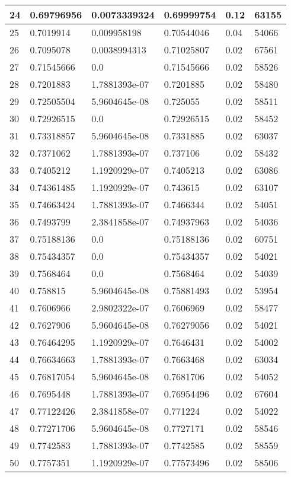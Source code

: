 \begin{longtable}{|l|l|l|l|l|l|}
24 & 0.69796956 & 0.0073339324 & 0.69999754 & 0.12 & 63155 \\ \hline 
25 & 0.7019914 & 0.009958198 & 0.70544046 & 0.04 & 54066 \\ \hline 
26 & 0.7095078 & 0.0038994313 & 0.71025807 & 0.02 & 67561 \\ \hline 
27 & 0.71545666 & 0.0 & 0.71545666 & 0.02 & 58526 \\ \hline 
28 & 0.7201883 & 1.7881393e-07 & 0.7201885 & 0.02 & 58480 \\ \hline 
29 & 0.72505504 & 5.9604645e-08 & 0.725055 & 0.02 & 58511 \\ \hline 
30 & 0.72926515 & 0.0 & 0.72926515 & 0.02 & 58452 \\ \hline 
31 & 0.73318857 & 5.9604645e-08 & 0.7331885 & 0.02 & 63037 \\ \hline 
32 & 0.7371062 & 1.7881393e-07 & 0.737106 & 0.02 & 58432 \\ \hline 
33 & 0.7405212 & 1.1920929e-07 & 0.7405213 & 0.02 & 63086 \\ \hline 
34 & 0.74361485 & 1.1920929e-07 & 0.743615 & 0.02 & 63107 \\ \hline 
35 & 0.74663424 & 1.7881393e-07 & 0.7466344 & 0.02 & 54051 \\ \hline 
36 & 0.7493799 & 2.3841858e-07 & 0.74937963 & 0.02 & 54036 \\ \hline 
37 & 0.75188136 & 0.0 & 0.75188136 & 0.02 & 60751 \\ \hline 
38 & 0.75434357 & 0.0 & 0.75434357 & 0.02 & 54021 \\ \hline 
39 & 0.7568464 & 0.0 & 0.7568464 & 0.02 & 54039 \\ \hline 
40 & 0.758815 & 5.9604645e-08 & 0.75881493 & 0.02 & 53954 \\ \hline 
41 & 0.7606966 & 2.9802322e-07 & 0.7606969 & 0.02 & 58477 \\ \hline 
42 & 0.7627906 & 5.9604645e-08 & 0.76279056 & 0.02 & 54021 \\ \hline 
43 & 0.76464295 & 1.1920929e-07 & 0.7646431 & 0.02 & 54002 \\ \hline 
44 & 0.76634663 & 1.7881393e-07 & 0.7663468 & 0.02 & 63034 \\ \hline 
45 & 0.76817054 & 5.9604645e-08 & 0.7681706 & 0.02 & 54052 \\ \hline 
46 & 0.7695448 & 1.7881393e-07 & 0.76954496 & 0.02 & 67604 \\ \hline 
47 & 0.77122426 & 2.3841858e-07 & 0.771224 & 0.02 & 54022 \\ \hline 
48 & 0.77271706 & 5.9604645e-08 & 0.7727171 & 0.02 & 58546 \\ \hline 
49 & 0.7742583 & 1.7881393e-07 & 0.7742585 & 0.02 & 58559 \\ \hline 
50 & 0.7757351 & 1.1920929e-07 & 0.77573496 & 0.02 & 58506 \\ \hline 
\end{longtable}